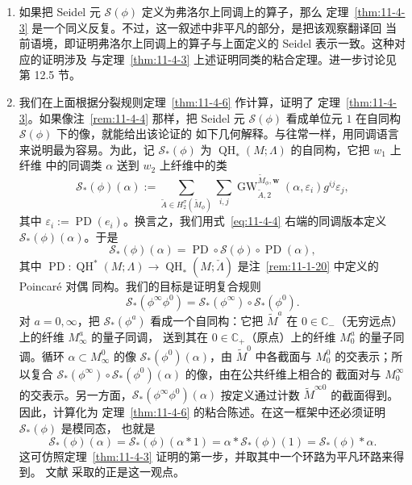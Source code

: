 \begin{remark}\label{rem:11-4-7}
\begin{enumerate}[label=(\roman*)]
\item 如果把 Seidel 元 $\mathcal S(\phi)$ 定义为弗洛尔上同调上的算子，那么
定理~\ref{thm:11-4-3} 是一个同义反复。不过，这一叙述中非平凡的部分，是把该观察翻译回
当前语境，即证明弗洛尔上同调上的算子与上面定义的 Seidel 表示一致。这种对应的证明涉及
与定理~\ref{thm:11-4-3} 上述证明同类的粘合定理。进一步讨论见第 12.5 节。

\item 我们在上面根据分裂规则定理~\ref{thm:11-4-6} 作计算，证明了
定理~\ref{thm:11-4-3}。如果像注~\ref{rem:11-4-4} 那样，把 Seidel 元
$\mathcal S(\phi)$ 看成单位元 $1$ 在自同构 $\mathcal S(\phi)$ 下的像，就能给出该论证的
如下几何解释。与往常一样，用同调语言来说明最为容易。为此，记
$\mathcal S_*(\phi)$ 为 $\operatorname{QH}_*(M;\Lambda)$ 的自同构，它把 $w_1$ 上纤维
中的同调类 $\alpha$ 送到 $w_2$ 上纤维中的类
\[
  \mathcal S_*(\phi)(\alpha):=
  \sum_{\widetilde A\in H_2^\sigma(\widetilde M_\phi)}
  \sum_{i,j}
  \operatorname{GW}^{\widetilde M_\phi,\mathbf w}_{\widetilde A,2}
  (\alpha,\varepsilon_i)g^{ij}\varepsilon_j,
\]
其中 $\varepsilon_i:=\operatorname{PD}(e_i)$。换言之，我们用式~\eqref{eq:11-4-4}
右端的同调版本定义 $\mathcal S_*(\phi)(\alpha)$。于是
\[
  \mathcal S_*(\phi)(\alpha)
  =\operatorname{PD}\circ\mathcal S(\phi)\circ\operatorname{PD}(\alpha),
\]
其中
$\operatorname{PD}:\operatorname{QH}^*(M;\Lambda)\to
\operatorname{QH}_*(M;\check\Lambda)$ 是注~\ref{rem:11-1-20} 中定义的 Poincar\'e 对偶
同构。我们的目标是证明复合规则
\[
  \mathcal S_*(\phi^\infty\phi^0)
  =\mathcal S_*(\phi^\infty)\circ\mathcal S_*(\phi^0).
\]
对 $a=0,\infty$，把 $\mathcal S_*(\phi^a)$ 看成一个自同构：它把
$\widetilde M^a$ 在 $0\in\mathbb C_-$（无穷远点）上的纤维 $M_\infty^a$ 的量子同调，
送到其在 $0\in\mathbb C_+$（原点）上的纤维 $M_0^a$ 的量子同调。循环
$\alpha\subset M_\infty^0$ 的像 $\mathcal S_*(\phi^0)(\alpha)$，由
$\widetilde M^0$ 中各截面与 $M_0^0$ 的交表示；所以复合
$\mathcal S_*(\phi^\infty)\circ\mathcal S_*(\phi^0)(\alpha)$ 的像，由在公共纤维上相合的
截面对与 $M_0^\infty$ 的交表示。另一方面，$\mathcal S_*(\phi^\infty\phi^0)(\alpha)$
按定义通过计数 $\widetilde M^{\infty0}$ 的截面得到。因此，计算化为
定理~\ref{thm:11-4-6} 的粘合陈述。在这一框架中还必须证明 $\mathcal S_*(\phi)$ 是模同态，
也就是
\[
  \mathcal S_*(\phi)(\alpha)
  =\mathcal S_*(\phi)(\alpha*1)
  =\alpha*\mathcal S_*(\phi)(1)
  =\mathcal S_*(\phi)*\alpha.
\]
这可仿照定理~\ref{thm:11-4-3} 证明的第一步，并取其中一个环路为平凡环路来得到。
文献  采取的正是这一观点。
\end{enumerate}
\end{remark}

